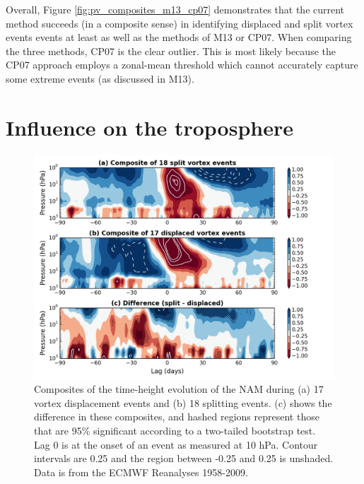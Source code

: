 Overall, Figure \ref{fig:pv_composites_m13_cp07} demonstrates that the current
method succeeds (in a composite sense) in identifying displaced and split vortex
events events at least as well as the methods of M13 or CP07. When comparing the
three methods, CP07 is the clear outlier. This is most likely because the CP07
approach employs a zonal-mean threshold which cannot accurately capture some
extreme events (as discussed in M13).


\section{Influence on the troposphere}
\label{sec:moments_analysis}

\begin{figure}
 \centering
 \noindent\includegraphics[width=\textwidth]{figures/chapter-moments/dripping_paint.png}
 \caption[NAM composites for split and displaced vortex events.]{Composites of
   the time-height evolution of the NAM during (a) 17 vortex displacement events
   and (b) 18 splitting events. (c) shows the difference in these composites,
   and hashed regions represent those that are 95\% significant according to a
   two-tailed bootstrap test. Lag 0 is at the onset of an event as measured at
   10 hPa. Contour intervals are 0.25 and the region between -0.25 and 0.25 is
   unshaded. Data is from the ECMWF Reanalyses 1958-2009.}
 \label{fig:dripping_paint}
\end{figure}

